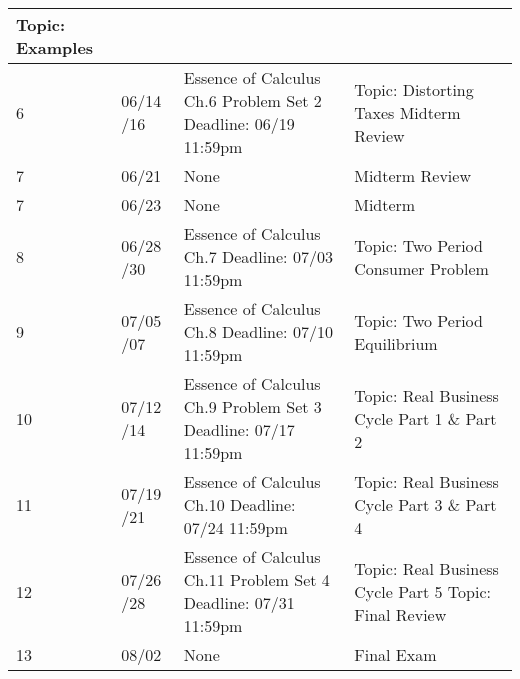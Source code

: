 \documentclass[12pt]{article}
\begin{document}
\begin{tabular}{|p{\bb}|p{\qq}|p{\rr}|p{\pp}|}
        \newline
        Topic: Examples
    \\
    \hline
        6
        &
        06/14
        \newline
        06/16
        &
        Essence of Calculus Ch.6
        \newline
        Problem Set 2
        \newline
        Deadline: 06/19 11:59pm
        &
        Topic: Distorting Taxes
        \newline
        Midterm Review
    \\
    \hline
        7
        &
        06/21
        &
        None
        &
        Midterm Review
    \\
    \hline
        7
        &
        06/23
        &
        None
        &
        Midterm
    \\
    \hline
        8
        &
        06/28
        \newline
        06/30
        &
        Essence of Calculus Ch.7
        \newline
        Deadline: 07/03 11:59pm
        &
        Topic: Two Period Consumer Problem
    \\
    \hline
        9
        &
        07/05
        \newline
        07/07
        &
        Essence of Calculus Ch.8
        \newline
        Deadline: 07/10 11:59pm
        &
        Topic: Two Period Equilibrium
    \\
    \hline
        10
        &
        07/12
        \newline
        07/14
        &
        Essence of Calculus Ch.9
        \newline
        Problem Set 3
        \newline
        Deadline: 07/17 11:59pm
        &
        Topic: Real Business Cycle Part 1 \& Part 2
    \\
    \hline
        11
        &
        07/19
        \newline
        07/21
        &
        Essence of Calculus Ch.10
        \newline
        Deadline: 07/24 11:59pm
        &
        Topic: Real Business Cycle Part 3 \& Part 4
    \\
    \hline
        12
        &
        07/26
        \newline
        07/28
        &
        Essence of Calculus Ch.11
        \newline
        Problem Set 4
        \newline
        Deadline: 07/31 11:59pm
        &
        Topic: Real Business Cycle Part 5
        \newline
        Topic: Final Review
    \\
    \hline
        13
        &
        08/02
        &
        None
        &
        Final Exam
    \\
    \hline
\end{tabular}
\end{document}
